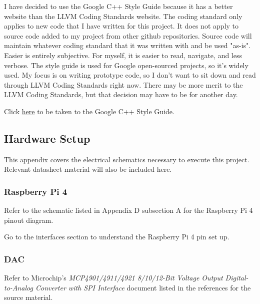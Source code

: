 \documentclass[journal]{IEEEtran}
\begin{document}
    I have decided to use the Google C++ Style Guide because it has a better website than the LLVM Coding Standards website.
    The coding standard only applies to new code that I have written for this project.
    It does not apply to source code added to my project from other github repositories.
    Source code will maintain whatever coding standard that it was written with and be used "as-is".
    Easier is entirely subjective. For myself, it is easier to read, navigate, and less verbose.
    The style guide is used for Google open-sourced projects, so it's widely used.
    My focus is on writing prototype code, so I don't want to sit down and read through LLVM Coding Standards right now.
    There may be more merit to the LLVM Coding Standards, but that decision may have to be for another day.

    Click {\href{https://google.github.io/styleguide/cppguide.html}{here}} to be taken to the Google C++ Style Guide.

    \subsection{Hardware Setup}
    This appendix covers the electrical schematics necessary to execute this project.
    Relevant datasheet material will also be included here.

    \subsubsection{Raspberry Pi 4}

    Refer to the schematic listed in Appendix D subsection A for the Raspberry Pi 4 pinout diagram.
    
    Go to the interfaces section to understand the Raspberry Pi 4 pin set up.

    \subsubsection{DAC} 
    
    Refer to Microchip's \emph{MCP4901/4911/4921 8/10/12-Bit Voltage Output Digital-to-Analog Converter with SPI Interface} document listed in the references for the source material.
\end{document}
